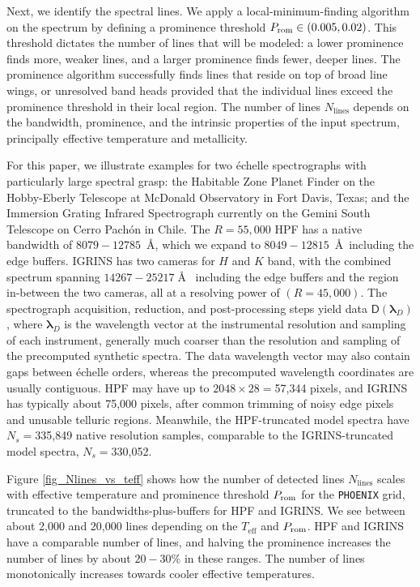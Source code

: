 \documentclass[twocolumn]{aastex631}
\begin{document}
Next, we identify the spectral lines. We apply a local-minimum-finding algorithm \citep{2020SciPy-NMeth} on the spectrum by defining a prominence threshold $P_{\rm rom} \in (0.005, 0.02)$. This threshold dictates the number of lines that will be modeled: a lower prominence finds more, weaker lines, and a larger prominence finds fewer, deeper lines. The prominence algorithm successfully finds lines that reside on top of broad line wings, or unresolved band heads provided that the individual lines exceed the prominence threshold in their local region. The number of lines $N_{\mathrm{lines}}$ depends on the bandwidth, prominence, and the intrinsic properties of the input spectrum, principally effective temperature and metallicity.

For this paper, we illustrate examples for two \'echelle spectrographs with particularly large spectral grasp: the Habitable Zone Planet Finder \citep[HPF,][]{2014SPIE.9147E..1GM} on the Hobby-Eberly Telescope at McDonald Observatory in Fort Davis, Texas; and the Immersion Grating Infrared Spectrograph \citep[IGRINS,][]{park14}
currently on the Gemini South Telescope on Cerro Pach\'on in Chile. The $R=55,000$ HPF has a native bandwidth of $8079-12785$~\AA, which we expand to $8049-12815$~\AA~including the edge buffers. IGRINS has two cameras for $H$ and $K$ band, with the combined spectrum spanning $14267-25217\;$\AA~ including the edge buffers and the region in-between the two cameras, all at a resolving power of $(R=45,000)$. The spectrograph acquisition, reduction, and post-processing steps yield data $\mathsf{D}(\bm{\lambda}_{D})$, where $\bm{\lambda}_{D}$ is the wavelength vector at the instrumental resolution and sampling of each instrument, generally much coarser than the resolution and sampling of the precomputed synthetic spectra. The data wavelength vector may also contain gaps between \'echelle orders, whereas the precomputed wavelength coordinates are usually contiguous. HPF may have up to $2048\times28=$57,344 pixels, and IGRINS has typically about 75,000 pixels, after common trimming of noisy edge pixels and unusable telluric regions.  Meanwhile, the HPF-truncated model spectra have $N_s=$335,849 native resolution samples, comparable to the IGRINS-truncated model spectra, $N_s=$330,052.

Figure \ref{fig_Nlines_vs_teff} shows how the number of detected lines $N_{\mathrm{lines}}$ scales with effective temperature and prominence threshold $P_{\rm rom}$ for the \texttt{PHOENIX} grid, truncated to the bandwidths-plus-buffers for HPF and IGRINS. We see between about 2,000 and 20,000 lines depending on the $T_{\mathrm{eff}}$ and $P_{\rm rom}$. HPF and IGRINS have a comparable number of lines, and halving the prominence increases the number of lines by about $20-30\%$ in these ranges. The number of lines monotonically increases towards cooler effective temperatures.
\end{document}
